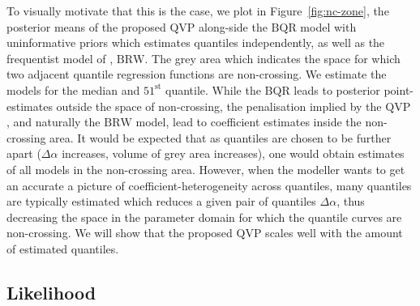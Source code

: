 To visually motivate that this is the case, we plot in Figure~\ref{fig:nc-zone}, the posterior means of the proposed $\mathrm{QVP}$ along-side  the $\mathrm{BQR}$ model with uninformative priors which estimates quantiles independently, as well as the frequentist model of \citet{bondell2010noncrossing}, $\mathrm{BRW}$. The grey area which indicates the space for which two adjacent quantile regression functions are non-crossing. We estimate the models for the median and $51^{\mathrm{st}}$ quantile. While the $\mathrm{BQR}$ leads to posterior point-estimates outside the space of non-crossing, the penalisation implied by the $\mathrm{QVP}$%
, and naturally the $\mathrm{BRW}$ model, lead  to coefficient estimates inside the non-crossing area. It would be expected that as quantiles are chosen to be further apart ($\Delta\alpha$ increases, volume of grey area increases), one would obtain estimates of all models in the non-crossing area. However, when the modeller wants to  get an accurate a picture of coefficient-heterogeneity across quantiles, many quantiles are typically estimated which reduces a given pair of quantiles $\Delta\alpha$, thus decreasing the space in the parameter domain for which the quantile curves are non-crossing. We will show that the proposed $\mathrm{QVP}$ scales well with the amount of estimated quantiles.
%
\subsection{Likelihood}\label{sec:likelihood}

